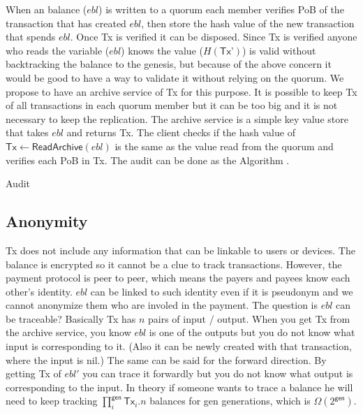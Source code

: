 \documentclass[10pt,fleqn]{article}
\begin{document}
When an balance ($ebl$) is written to a quorum each member verifies \textsf{PoB} of the transaction that has created $ebl$, then store the hash value of the new transaction that spends $ebl$. Once \textsf{Tx} is verified it can be disposed. Since \textsf{Tx} is verified anyone who reads the variable ($ebl$) knows the value ($H(\textsf{Tx'})$) is valid without backtracking the balance to the genesis, but because of the above concern it would be good to have a way to validate it without relying on the quorum. We propose to have an archive service of \textsf{Tx} for this purpose. It is possible to keep \textsf{Tx} of all transactions in each quorum member but it can be too big and it is not necessary to keep the replication. The archive service is a simple key value store that takes $ebl$ and returns \textsf{Tx}. The client checks if the hash value of $\textsf{Tx} \leftarrow \textsf{ReadArchive}(ebl)$ is the same as the value read from the quorum and verifies each \textsf{PoB} in \textsf{Tx}.
The audit can be done as the Algorithm .

\begin{algorithm}[h]
\label{AuditAlgo}
\caption{Audit}
 {
   {
     {
      \Continue
    }
     {
    }
     {
    }
  }
}
\end{algorithm}

\subsection{Anonymity}
\textsf{Tx} does not include any information that can be linkable to users or devices. The balance is encrypted so it cannot be a clue to track transactions. However, the payment protocol is peer to peer, which means the payers and payees know each other's identity. $ebl$ can be linked to such identity even if it is pseudonym and we cannot anonymize them who are involed in the payment. The question is $ebl$ can be traceable? Basically \textsf{Tx} has $n$ pairs of input / output. When you get \textsf{Tx} from the archive service, you know $ebl$ is one of the \textsf{outputs} but you do not know what input is corresponding to it. (Also it can be newly created with that transaction, where the input is \textsf{nil}.) The same can be said for the forward direction. By getting \textsf{Tx} of $ebl'$ you can trace it forwardly but you do not know what output is corresponding to the input. In theory if someone wants to trace a balance he will need to keep tracking $\prod_i^{\textsf{gen}} \textsf{Tx}_i.n$ balances for \textsf{gen} generations, which is $\Omega(2^{\textsf{gen}})$.
\end{document}
